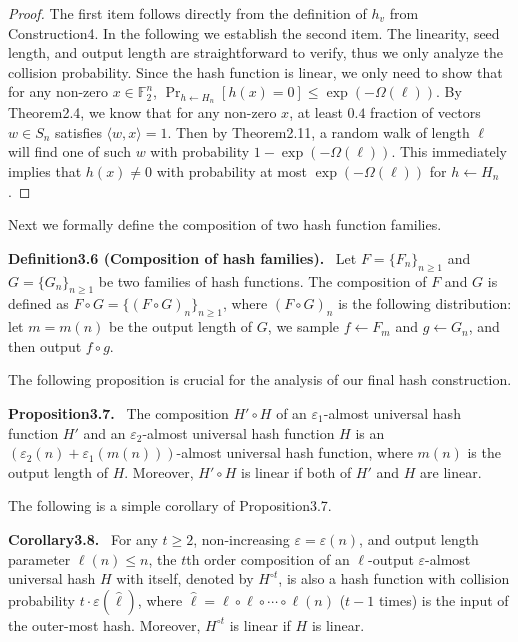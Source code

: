 \documentclass[10pt,a4paper]{article}
\newenvironment{authorclaim}[1]{\par\medskip\noindent\textbf{#1.}\ }{\par\medskip}
\begin{document}
\begin{proof}
The first item follows directly from the definition of $h_v$ from Construction4. In the following we establish the second item.
The linearity, seed length, and output length are straightforward to verify, thus we only analyze the collision probability. Since the hash function is linear, we only need to show that for any non-zero $x\in\mathbb F_2^n$, $\Pr_{h\leftarrow H_n}[h(x)=0]\le\exp(-\Omega(\ell))$. By Theorem2.4, we know that for any non-zero $x$, at least $0.4$ fraction of vectors $w\in S_n$ satisfies $\langle w,x\rangle=1$. Then by Theorem2.11, a random walk of length $\ell$ will find one of such $w$ with probability $1-\exp(-\Omega(\ell))$. This immediately implies that $h(x)\ne0$ with probability at most $\exp(-\Omega(\ell))$ for $h\leftarrow H_n$.
\end{proof}
Next we formally define the composition of two hash function families.
\begin{authorclaim}{Definition3.6 (Composition of hash families)}
Let $F=\{F_n\}_{n\ge1}$ and $G=\{G_n\}_{n\ge1}$ be two families of hash functions. The composition of $F$ and $G$ is defined as $F\circ G=\{(F\circ G)_n\}_{n\ge1}$, where $(F\circ G)_n$ is the following distribution: let $m=m(n)$ be the output length of $G$, we sample $f\leftarrow F_m$ and $g\leftarrow G_n$, and then output $f\circ g$.
\end{authorclaim}
The following proposition is crucial for the analysis of our final hash construction.
\begin{authorclaim}{Proposition3.7}
The composition $H'\circ H$ of an $\varepsilon_1$-almost universal hash function $H'$ and an $\varepsilon_2$-almost universal hash function $H$ is an $(\varepsilon_2(n)+\varepsilon_1(m(n)))$-almost universal hash function, where $m(n)$ is the output length of $H$. Moreover, $H'\circ H$ is linear if both of $H'$ and $H$ are linear.
\end{authorclaim}
The following is a simple corollary of Proposition3.7.
\begin{authorclaim}{Corollary3.8}
For any $t\ge2$, non-increasing $\varepsilon=\varepsilon(n)$, and output length parameter $\ell(n)\le n$, the $t$th order composition of an $\ell$-output $\varepsilon$-almost universal hash $H$ with itself, denoted by $H^{\circ t}$, is also a hash function with collision probability $t\cdot\varepsilon(\hat\ell)$, where $\hat\ell=\ell\circ\ell\circ\cdots\circ\ell(n)$ ($t-1$ times) is the input of the outer-most hash. Moreover, $H^{\circ t}$ is linear if $H$ is linear.
\end{authorclaim}
\end{document}
